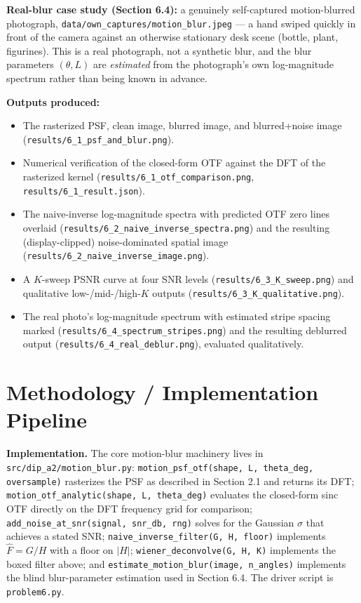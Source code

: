 \documentclass[11pt]{article}
\begin{document}
\textbf{Real-blur case study (Section 6.4):} a genuinely self-captured motion-blurred
photograph, \texttt{data/own\_captures/motion\_blur.jpeg} — a hand swiped quickly in front of
the camera against an otherwise stationary desk scene (bottle, plant, figurines). This is a real
photograph, not a synthetic blur, and the blur parameters $(\theta,L)$ are \emph{estimated} from
the photograph's own log-magnitude spectrum rather than being known in advance.

\textbf{Outputs produced:}
\begin{itemize}
\item The rasterized PSF, clean image, blurred image, and blurred+noise image
(\texttt{results/6\_1\_psf\_and\_blur.png}).
\item Numerical verification of the closed-form OTF against the DFT of the rasterized kernel
(\texttt{results/6\_1\_otf\_comparison.png}, \texttt{results/6\_1\_result.json}).
\item The naive-inverse log-magnitude spectra with predicted OTF zero lines overlaid
(\texttt{results/6\_2\_naive\_inverse\_spectra.png}) and the resulting (display-clipped)
noise-dominated spatial image (\texttt{results/6\_2\_naive\_inverse\_image.png}).
\item A $K$-sweep PSNR curve at four SNR levels (\texttt{results/6\_3\_K\_sweep.png}) and
qualitative low-/mid-/high-$K$ outputs (\texttt{results/6\_3\_K\_qualitative.png}).
\item The real photo's log-magnitude spectrum with estimated stripe spacing marked
(\texttt{results/6\_4\_spectrum\_stripes.png}) and the resulting deblurred output
(\texttt{results/6\_4\_real\_deblur.png}), evaluated qualitatively.
\end{itemize}

\section{Methodology / Implementation Pipeline}

\textbf{Implementation.} The core motion-blur machinery lives in
\texttt{src/dip\_a2/motion\_blur.py}: \texttt{motion\_psf\_otf(shape, L, theta\_deg,
oversample)} rasterizes the PSF as described in Section 2.1 and returns its DFT;
\texttt{motion\_otf\_analytic(shape, L, theta\_deg)} evaluates the closed-form sinc OTF directly
on the DFT frequency grid for comparison; \texttt{add\_noise\_at\_snr(signal, snr\_db, rng)}
solves for the Gaussian $\sigma$ that achieves a stated SNR; \texttt{naive\_inverse\_filter(G, H,
floor)} implements $\hat F=G/H$ with a floor on $|H|$; \texttt{wiener\_deconvolve(G, H, K)}
implements the boxed filter above; and \texttt{estimate\_motion\_blur(image, n\_angles)}
implements the blind blur-parameter estimation used in Section 6.4. The driver script is
\texttt{problem6.py}.
\end{document}
